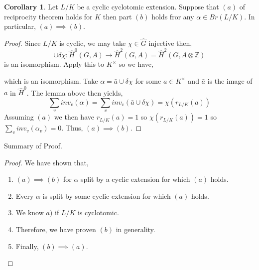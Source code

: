 \documentclass[12pt]{extarticle}
\newcommand{\Z}{\mathbb{Z}}
\theoremstyle{definition}
\newtheorem{corollary}[theorem]{Corollary}
\begin{document}
\begin{corollary}
Let $L/K$ be a cyclic cyclotomic extension. Suppose that $(a)$ of reciprocity theorem holds for $K$ then part $(b)$ holds fror any $\alpha \in Br(L/K)$. In particular, $(a) \implies (b)$. 
\end{corollary}

\begin{proof}
Since $L/K$ is cyclic, we may take $\chi \in \hat{G}$ injective then, 
\[\cup \delta \chi : \hat{H}^0(G, A) \to \hat{H}^2(G, A) = \hat{H}^2(G, A \otimes \Z)\]
is an isomorphism. Apply this to $K^\times$ so we have,
\begin{center}
\end{center}
which is an isomorphism. Take $\alpha = \bar{a} \cup \delta \chi$ for some $a \in K^\times$ and $\bar{a}$ is the image of $a$ in $\hat{H}^0$. The lemma above then yields,
\[ \sum_v inv_v(\alpha) = \sum_v inv_v(\bar{a} \cup \delta \chi) = \chi(r_{L/K}(a))\]
Assuming $(a)$ we then have $r_{L/K}(a) = 1$ so $\chi(r_{L/K}(a)) = 1$ so $\sum_{v} inv_v(\alpha_v) = 0$. Thus, $(a) \implies (b)$. 

\end{proof}

Summary of Proof.

\begin{proof}
We have shown that,
\begin{enumerate}
\item $(a) \implies (b)$ for $\alpha$ split by a cyclic extension for which $(a)$ holds. 

\item Every $\alpha$ is split by some cyclic extension for which $(a)$ holds.

\item We know $a)$ if $L/K$ is cyclotomic.

\item Therefore, we have proven $(b)$ in generality. 

\item Finally, $(b) \implies (a)$.
\end{enumerate}
\end{proof}
\end{document}
